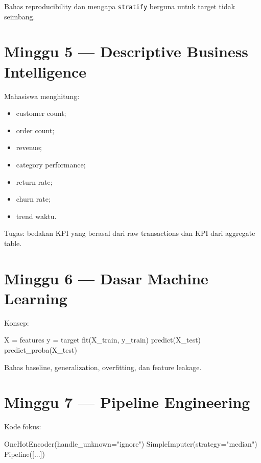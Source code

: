 \documentclass[
  indonesian,
  letterpaper,
  DIV=11,
  numbers=noendperiod]{scrreprt}
\newenvironment{Shaded}{\begin{snugshade}}{\end{snugshade}}
\newcommand{\NormalTok}[1]{\textcolor[rgb]{0.00,0.23,0.31}{#1}}
\newcommand{\OperatorTok}[1]{\textcolor[rgb]{0.37,0.37,0.37}{#1}}
\newcommand{\StringTok}[1]{\textcolor[rgb]{0.13,0.47,0.30}{#1}}
\providecommand{\tightlist}{%
  \setlength{\itemsep}{0pt}\setlength{\parskip}{0pt}}
\begin{document}
Bahas reproducibility dan mengapa \texttt{stratify} berguna untuk target
tidak seimbang.

\section{Minggu 5 --- Descriptive Business
Intelligence}\label{minggu-5-descriptive-business-intelligence}

Mahasiswa menghitung:

\begin{itemize}
\tightlist
\item
  customer count;
\item
  order count;
\item
  revenue;
\item
  category performance;
\item
  return rate;
\item
  churn rate;
\item
  trend waktu.
\end{itemize}

Tugas: bedakan KPI yang berasal dari raw transactions dan KPI dari
aggregate table.

\section{Minggu 6 --- Dasar Machine
Learning}\label{minggu-6-dasar-machine-learning}

Konsep:

\begin{Shaded}
\begin{Highlighting}[]
\NormalTok{X = features}
\NormalTok{y = target}
\NormalTok{fit(X\_train, y\_train)}
\NormalTok{predict(X\_test)}
\NormalTok{predict\_proba(X\_test)}
\end{Highlighting}
\end{Shaded}

Bahas baseline, generalization, overfitting, dan feature leakage.

\section{Minggu 7 --- Pipeline
Engineering}\label{minggu-7-pipeline-engineering}

Kode fokus:

\begin{Shaded}
\begin{Highlighting}[]
\NormalTok{OneHotEncoder(handle\_unknown}\OperatorTok{=}\StringTok{"ignore"}\NormalTok{)}
\NormalTok{SimpleImputer(strategy}\OperatorTok{=}\StringTok{"median"}\NormalTok{)}
\NormalTok{Pipeline([...])}
\end{Highlighting}
\end{Shaded}
\end{document}
